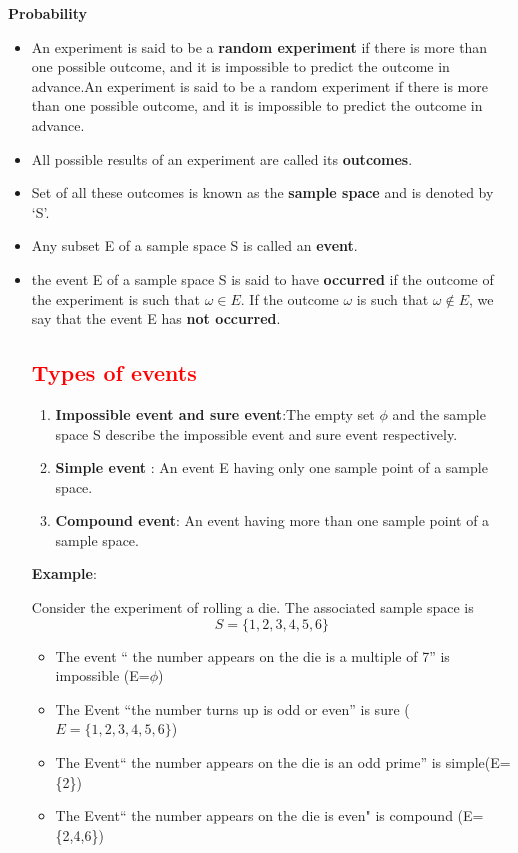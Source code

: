 \documentclass{article}
\begin{document}
\begin{center}
    {\LARGE \textbf{Probability} }
\end{center}

\begin{multicols}{2}

\begin{itemize}

    \item An experiment is said to be a \textbf{random experiment} if there is more than one possible outcome, and it is impossible to predict the outcome in advance.An experiment is said to be a random experiment if there is more than one possible outcome, and it is impossible to predict the outcome in advance.
    \item All possible results of an experiment are called its \textbf{outcomes}.
    \item Set of all these outcomes is known as the \textbf{sample space} and is denoted by ‘S’.
     \item Any subset E of a sample space S is called an \textbf{event}.
     
    \item the event E of a sample space S is said to have \textbf{occurred} if the outcome of the experiment is such that  $\omega \in  E$. If the outcome $\omega$ is such that $\omega \not \in E$, we say that the event E has \textbf{not occurred}.

    \subsection*{\large \textcolor{red}{Types of events}}
    \begin{enumerate}
        \item  \textbf{Impossible event and sure event}:The empty set $\phi$ and the sample space S describe the impossible event and sure event respectively.
        \item \textbf{Simple event} : An event E having only one sample point of a sample space.
        \item  \textbf{Compound event}: An event having more than one sample point of a sample space.
    \end{enumerate}

    \textbf{Example}: 

    Consider the experiment of rolling a die. The associated sample space is
   $$ S = \{1, 2, 3, 4, 5, 6\}$$
   \begin{itemize}
       \item The event “ the number appears on the die is a multiple of 7” is impossible (E=$\phi$)
       \item The Event “the number turns up is odd or even” is sure ( $ E = \{1, 2, 3, 4, 5, 6\}$)
       \item The Event“ the number appears on the die is an odd prime” is simple(E=\{2\})
       \item The Event“ the number appears on the die is even" is compound (E=\{2,4,6\})
   \end{itemize}
\end{itemize}


\end{multicols}
\end{document}
